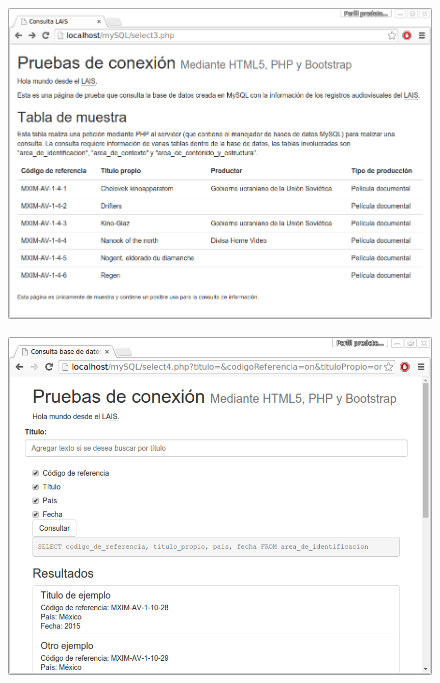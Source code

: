 \documentclass{beamer}
\begin{document}
\begin{frame}
	\begin{figure}[H]
		\centering
		\includegraphics[keepaspectratio=true,width=\linewidth]{Prototipo_01.png}
		\label{fig:prueba_conexion}
	\end{figure}
\end{frame}

\begin{frame}
	\begin{figure}[H]
		\centering
		\includegraphics[keepaspectratio=true,width=\linewidth]{Prototipo_02.png}
		\label{fig:prueba_formulario}
	\end{figure}
\end{frame}
\end{document}

